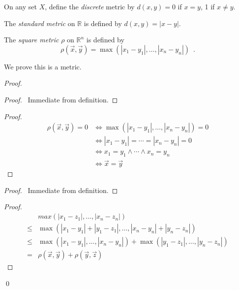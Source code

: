 \begin{df}
On any set $X$, define the \emph{discrete} metric by $d(x,y) = 0$ if $x = y$, 1 if $x \neq y$.
\end{df}

\begin{df}
The \emph{standard metric} on $\mathbb{R}$ is defined by $d(x,y) = |x-y|$.
\end{df}

\begin{df}
The \emph{square metric} $\rho$ on $\mathbb{R}^n$ is defined by
\[ \rho(\vec{x}, \vec{y}) = \max(|x_1 - y_1|, \ldots, |x_n - y_n|) \enspace . \]

We prove this is a metric.
\end{df}

\begin{proof}
\pf
{}
\begin{proof}
	\pf\ Immediate from definition.
\end{proof}
\begin{proof}
	\pf
	\begin{align*}
		\rho(\vec{x}, \vec{y}) = 0 & \Leftrightarrow \max(|x_1 - y_1|, \ldots, |x_n - y_n|) = 0 \\
		& \Leftrightarrow |x_1 - y_1| = \cdots = |x_n - y_n| = 0 \\
		& \Leftrightarrow x_1 = y_1 \wedge \cdots \wedge x_n = y_n \\
		& \Leftrightarrow \vec{x} = \vec{y}
	\end{align*}
\end{proof}
\begin{proof}
	\pf\ Immediate from definition.
\end{proof}
\begin{proof}
	\pf
	\begin{align*}
		& max(|x_1 - z_1|, \ldots, |x_n - z_n|) \\
		\leq & \max(|x_1 - y_1| + |y_1 - z_1|, \ldots, |x_n - y_n| + |y_n - z_n|) \\
		\leq & \max(|x_1 - y_1|, \ldots, |x_n - y_n|) + \max(|y_1 - z_1|, \ldots, |y_n - z_n|) \\
		= & \rho(\vec{x}, \vec{y}) + \rho(\vec{y}, \vec{z})
	\end{align*}
\end{proof}
\qed
\end{proof}

